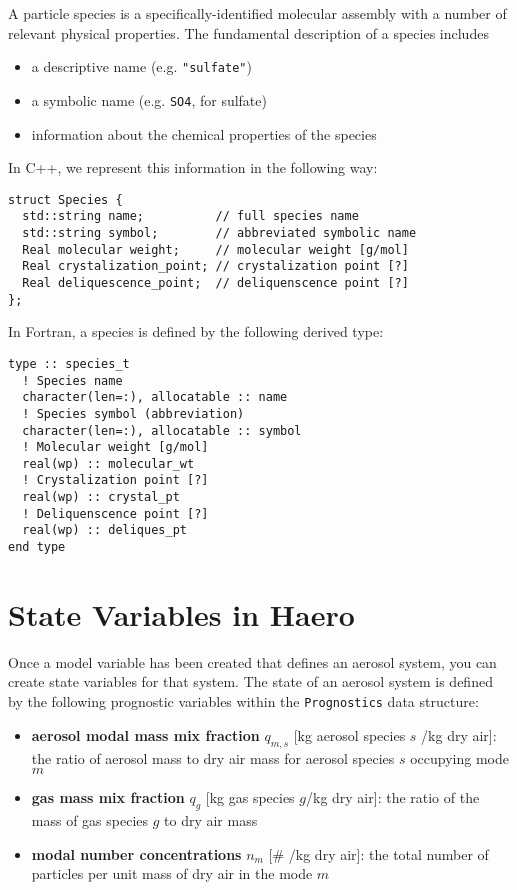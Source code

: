 A particle species is a specifically-identified molecular assembly with
a number of relevant physical properties. The fundamental description of a
species includes

\begin{itemize}
  \item a descriptive name (e.g. \texttt{"sulfate"})
  \item a symbolic name (e.g. \texttt{SO4}, for sulfate)
  \item information about the chemical properties of the species
\end{itemize}

In C++, we represent this information in the following way:

\begin{lstlisting}
struct Species {
  std::string name;          // full species name
  std::string symbol;        // abbreviated symbolic name
  Real molecular weight;     // molecular weight [g/mol]
  Real crystalization_point; // crystalization point [?]
  Real deliquescence_point;  // deliquenscence point [?]
};
\end{lstlisting}

In Fortran, a species is defined by the following derived type:
\begin{lstlisting}
type :: species_t
  ! Species name
  character(len=:), allocatable :: name
  ! Species symbol (abbreviation)
  character(len=:), allocatable :: symbol
  ! Molecular weight [g/mol]
  real(wp) :: molecular_wt
  ! Crystalization point [?]
  real(wp) :: crystal_pt
  ! Deliquenscence point [?]
  real(wp) :: deliques_pt
end type
\end{lstlisting}

\section{State Variables in Haero}

Once a model variable has been created that defines an aerosol system, you can
create state variables for that system. The state of an aerosol system is
defined by the following prognostic variables within the \texttt{Prognostics} data
structure:

\begin{itemize}
  \item {\bf aerosol modal mass mix fraction} $q_{m,s}$ [kg aerosol species $s$ /kg dry air]:
        the ratio of aerosol mass to dry air mass for aerosol species $s$
        occupying mode $m$
  \item {\bf gas mass mix fraction} $q_g$ [kg gas species $g$/kg dry air]: the
        ratio of the mass of gas species $g$ to dry air mass
  \item {\bf modal number concentrations} $n_m$ [\# /kg dry air]: the total number of
        particles per unit mass of dry air in the mode $m$
\end{itemize}

